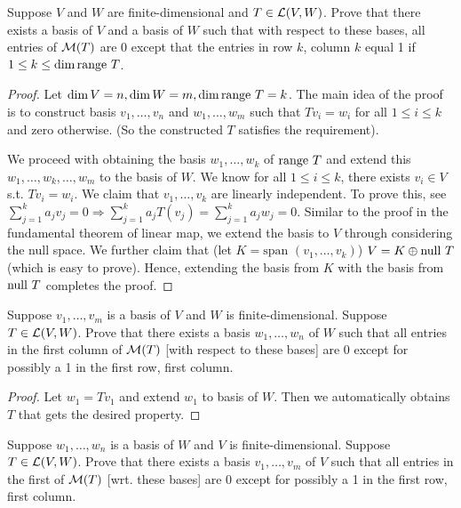\documentclass{extarticle}
\begin{document}
\begin{problem}{5}
    Suppose \(V\) and \(W\) are finite-dimensional and \(T \in \mathcal{L}(V, W)\). Prove that 
    there exists a basis of \(V\) and a basis of \(W\) such that with respect to these bases, 
    all entries of \(\mathcal{M}(T)\) are 0 except that the entries in row \(k\), column \(k\) equal 1 
    if \(1 \leq k \leq \dim \text{range } T\). 
\end{problem}

\begin{proof}
Let \(\dim V = n, \dim W = m, \dim \text{range } T = k\). The main idea of the proof is to construct 
basis \(v_1, \ldots, v_n\) and \(w_1, \ldots, w_m\) such that \(Tv_i = w_i\) for all \(1 \leq i \leq k\)
and zero otherwise. (So the constructed \(T\) satisfies the requirement). 

We proceed with obtaining the basis \(w_1, \ldots, w_k\) of \(\text{range } T\) and extend this 
\(w_1, \ldots, w_k, \ldots, w_m\) to the basis of \(W\). We know for all \(1 \leq i \leq k\),
there exists \(v_i \in V\) s.t. \(T v_i = w_i\). We claim that \(v_1, \ldots, v_k\) are linearly 
independent. To prove this, see \(\sum_{j=1}^{k}a_j v_j = 0 \Rightarrow \sum_{j=1}^{k}a_jT(v_j)
= \sum_{j=1}^{k}a_j w_j = 0\). Similar to the proof in the fundamental theorem of linear map, 
we extend the basis to \(V\) through considering the null space. We further claim that 
(let \(K = \text{span }(v_1, \ldots, v_k)\)) \(V = K \oplus \text{null } T\) (which is easy to prove). Hence, 
extending the basis from \(K\) with the basis from \(\text{null } T\) completes the proof.  
\end{proof}



\begin{problem}{6}
    Suppose \(v_1, \ldots, v_m\) is a basis of \(V\) and \(W\) is finite-dimensional. Suppose 
    \(T \in \mathcal{L}(V, W)\). Prove that there exists a basis \(w_1, \ldots, w_n\) of \(W\) such 
    that all entries in the first column of \(\mathcal{M}(T)\) [with respect to these bases] are 0 
    except for possibly a 1 in the first row, first column. 
\end{problem}


\begin{proof}
Let \(w_1 = T v_1\) and extend \(w_1\) to basis of \(W\). Then we automatically obtains \(T\) 
that gets the desired property. 
\end{proof}


\begin{problem}{7}
    Suppose \(w_1, \ldots, w_n\) is a basis of \(W\) and \(V\) is finite-dimensional. Suppose 
    \(T \in \mathcal{L}(V, W)\). Prove that there exists a basis \(v_1, \ldots, v_m\) of \(V\) such 
    that all entries in the first of \(\mathcal{M}(T)\) [wrt. these bases] are 0 except for possibly 
    a 1 in the first row, first column. 
\end{problem}
\end{document}
